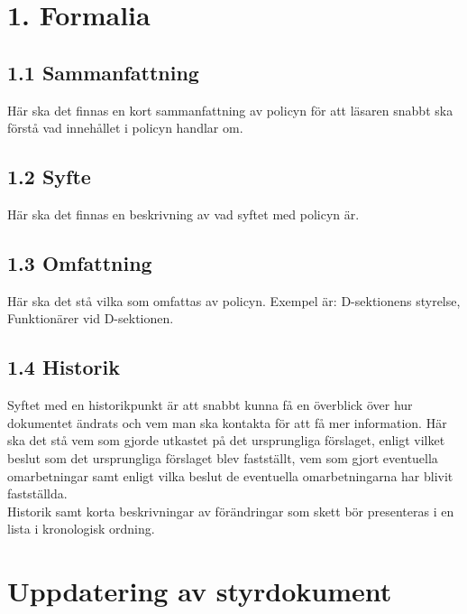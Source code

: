 \documentclass[]{dsekprotokoll}
\begin{document}
\hfill\begin{minipage}{\dimexpr\textwidth-3cm}
    \xdef\tpd{\the\prevdepth}
    \section*{1. Formalia}
    \subsection*{1.1 Sammanfattning}
    Här ska det finnas en kort sammanfattning av policyn för att läsaren
    snabbt ska förstå vad innehållet i policyn handlar om. \\

    \subsection*{1.2 Syfte}
    Här ska det finnas en beskrivning av vad syftet med policyn är. \\

    \subsection*{1.3 Omfattning}
    Här ska det stå vilka som omfattas av policyn. Exempel är: D-sektionens styrelse, Funktionärer vid D-sektionen.\\

    \subsection*{1.4 Historik}
    Syftet med en historikpunkt är att snabbt kunna få en överblick över hur
    dokumentet ändrats och vem man ska kontakta för att få mer
    information. Här ska det stå vem som gjorde utkastet på det ursprungliga
    förslaget, enligt vilket beslut som det ursprungliga förslaget blev fastställt, vem som gjort eventuella omarbetningar samt enligt vilka beslut de
    eventuella omarbetningarna har blivit fastställda.
    \\

    Historik samt korta beskrivningar av förändringar som skett bör presenteras i en lista i kronologisk ordning. \\
\end{minipage}

\prevdepth\tpd


\section{Uppdatering av styrdokument}
\end{document}
